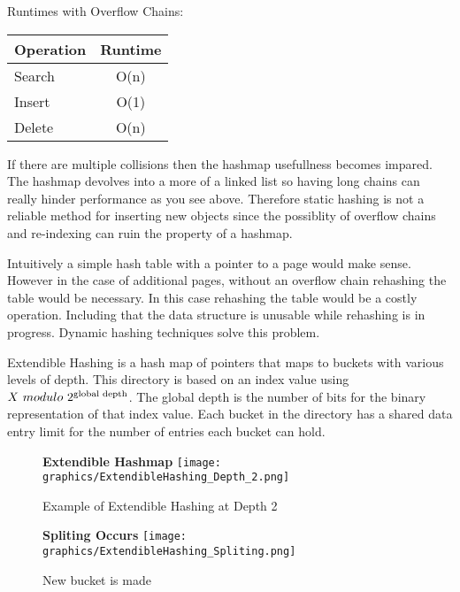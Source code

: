 \documentclass[letterpaper, 12pt]{article}
\begin{document}
Runtimes with Overflow Chains:
\par\vspace{\baselineskip}
\begin{center}
\begin{tabular}{l | c}
  \hline
  Operation & Runtime \\ \hline \hline
  Search & O(n) \\ \hline
  Insert & O(1) \\ \hline
  Delete & O(n) \\ \hline
\end{tabular}
\end{center}

If there are multiple collisions then the hashmap usefullness becomes impared. The hashmap devolves into a more
of a linked list so having long chains can really hinder performance as you see above. Therefore static hashing
is not a reliable method for inserting new objects since the possiblity of overflow chains and re-indexing can
ruin the property of a hashmap.
\par\vspace{\baselineskip}

Intuitively a simple hash table with a pointer to a page would make sense. However in the case of
additional pages, without an overflow chain rehashing the table would be necessary. In this
case rehashing the table would be a costly operation. Including that the data structure is unusable
while rehashing is in progress. Dynamic hashing techniques solve this problem.
\par\vspace{\baselineskip}

Extendible Hashing is a hash map of pointers that maps to buckets with various levels of depth. This directory
is based on an index value using $ X\ modulo\ 2\textsuperscript{global depth} $. The global depth is the number of bits for the binary
representation of that index value. Each bucket in the directory has a shared data entry limit for the number of
entries each bucket can hold.

\begin{figure}
  \centering
  \textbf{Extendible Hashmap}
  \texttt{[image: graphics/ExtendibleHashing\_Depth\_2.png]}
  \caption{Example of Extendible Hashing at Depth 2}
\end{figure}

\begin{figure}
  \centering
  \textbf{Spliting Occurs}
  \texttt{[image: graphics/ExtendibleHashing\_Spliting.png]}
  \caption{New bucket is made}
\end{figure}
\end{document}
